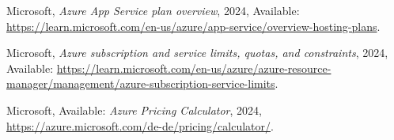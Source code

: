 \documentclass{llncs}
\begin{document}

\begin{thebibliography}{5}

    Microsoft,
    \emph{Azure App Service plan overview},
    2024, Available:
    \url{https://learn.microsoft.com/en-us/azure/app-service/overview-hosting-plans}.

    Microsoft,
    \emph{Azure subscription and service limits, quotas, and constraints},
    2024, Available:
    \url{https://learn.microsoft.com/en-us/azure/azure-resource-manager/management/azure-subscription-service-limits}.

    Microsoft, Available:
    \emph{Azure Pricing Calculator}, 2024,
    \url{https://azure.microsoft.com/de-de/pricing/calculator/}.



\end{thebibliography}
\end{document}

